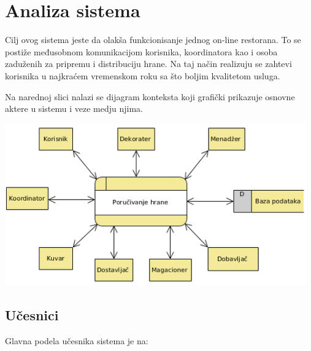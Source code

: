\section{Analiza sistema}
Cilj ovog sistema jeste da olakša funkcionisanje jednog on-line restorana. To se postiže međusobnom komunikacijom korisnika, koordinatora kao i osoba zaduženih za pripremu i distribuciju hrane. Na taj način realizuju se zahtevi korisnika u najkraćem vremenskom roku sa što boljim kvalitetom usluga.

Na narednoj slici nalazi se dijagram konteksta koji grafički prikazuje osnovne aktere u sistemu i veze medju njima.

\begin{center}
\includegraphics[width = 130mm]{slike/DC.jpg}
\end{center}








\subsection{Učesnici}
Glavna podela učesnika sistema je na:

